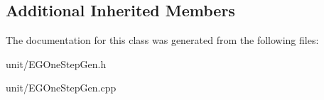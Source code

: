 \subsection*{Additional Inherited Members}


The documentation for this class was generated from the following files\+:\begin{DoxyCompactItemize}
\item 
unit/E\+G\+One\+Step\+Gen.\+h\item 
unit/E\+G\+One\+Step\+Gen.\+cpp\end{DoxyCompactItemize}
